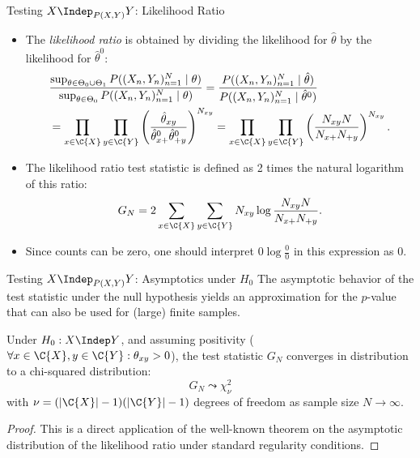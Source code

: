 \begin{frame}{Testing $X \Indep_{P(X,Y)} Y$: Likelihood Ratio}
  \begin{itemize}
    \item The \emph{likelihood ratio} is obtained by dividing the likelihood for $\hat \theta$ by the likelihood for $\hat \theta^0$:
  \begin{equation*}\begin{split}
  & \frac{\sup_{\theta\in\Theta_0\cup\Theta_1} P((X_n,Y_n)_{n=1}^N \mid \theta)}{\sup_{\theta\in\Theta_0} P((X_n,Y_n)_{n=1}^N \mid \theta)}
    = \frac{P((X_n,Y_n)_{n=1}^N \mid \hat\theta)}{P((X_n,Y_n)_{n=1}^N \mid \hat\theta^0)} \\
  & = \prod_{x\in\C{X}} \prod_{y\in\C{Y}} \left(\frac{\hat \theta_{xy}}{\hat \theta^0_{x+} \hat \theta^0_{+ y}}\right)^{N_{xy}} 
    = \prod_{x\in\C{X}} \prod_{y\in\C{Y}} \left(\frac{N_{xy} N}{N_{x+} N_{+ y}}\right)^{N_{xy}}.
\end{split}\end{equation*}
\item The likelihood ratio test statistic is defined as 2 times the natural logarithm of this ratio:
\begin{equation*}
  G_N %
  = 2 \sum_{x\in\C{X}} \sum_{y\in\C{Y}} N_{xy} \log \frac{N_{xy} N}{N_{x+} N_{+ y}}.
\end{equation*}
\item Since counts can be zero, one should interpret $0 \log \frac{0}{0}$ in this expression as $0$.
  \end{itemize}
\end{frame}

\begin{frame}{Testing $X \Indep_{P(X,Y)} Y$: Asymptotics under $H_0$}
The asymptotic behavior of the test statistic under the null hypothesis yields
an approximation for the $p$-value that can also be used for (large) finite samples.
\begin{Prp}
Under $H_0 : X \Indep Y$, and assuming positivity ($\forall x \in \C{X}, y\in \C{Y}: \theta_{xy} > 0$),
the test statistic $G_N$ converges in distribution to a chi-squared distribution:
$$G_N \leadsto \chi_\nu^2$$
with $\nu = (|\C{X}| - 1)(|\C{Y}| - 1)$ degrees of freedom as sample size $N \to \infty$.
\end{Prp}
\begin{proof}
  This is a direct application of the well-known theorem on the asymptotic distribution of the likelihood ratio under standard regularity conditions.
\end{proof}
\end{frame}

